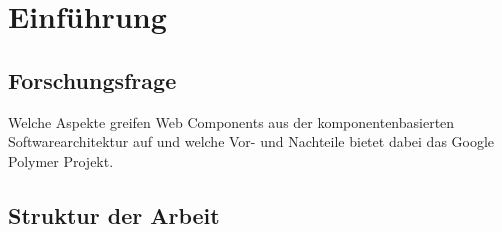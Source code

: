 \section{Einführung}
\label{sec:1_Einführung}








\subsection{Forschungsfrage}
\label{sec:1_Forschungsfrage}
Welche Aspekte greifen Web Components aus der komponentenbasierten Softwarearchitektur auf und welche Vor- und Nachteile bietet dabei das Google Polymer Projekt.

\subsection{Struktur der Arbeit}
\label{sec:1_Struktur}

